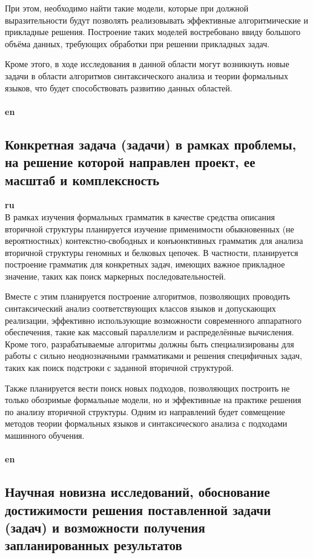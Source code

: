 \documentclass[12pt]{article}  %
\theoremstyle{remark}
\begin{document}
При этом, необходимо найти такие модели, которые при должной выразительности будут позволять реализовывать эффективные алгоритмические и прикладные решения.
Построение таких моделей востребовано ввиду большого объёма данных, требующих обработки при решении прикладных задач.

Кроме этого, в ходе исследования в данной области могут возникнуть новые задачи в области алгоритмов синтаксического анализа и теории формальных языков, что будет способствовать развитию данных областей.
\\
\\
\textbf{en}\\



\subsection{Конкретная задача (задачи) в рамках проблемы, на решение которой направлен проект, ее масштаб и комплексность}

\textbf{ru}\\
В рамках изучения формальных грамматик в качестве средства описания вторичной структуры планируется изучение применимости обыкновенных (не вероятностных) контекстно-свободных и конъюнктивных грамматик для анализа вторичной структуры геномных и белковых цепочек.
В частности, планируется построение грамматик для конкретных задач, имеющих важное прикладное значение, таких как поиск маркерных последовательностей.

Вместе с этим планируется построение алгоритмов, позволяющих проводить синтаксический анализ соответствующих классов языков и допускающих реализации, эффективно использующие возможности современного аппаратного обеспечения, такие как массовый параллелизм и распределённые вычисления.
Кроме того, разрабатываемые алгоритмы должны быть специализированы для работы с сильно неоднозначными грамматиками и решения специфичных задач, таких как поиск подстроки с заданной вторичной структурой.

Также планируется вести поиск новых подходов, позволяющих построить не только обозримые формальные модели, но и эффективные на практике решения по анализу вторичной структуры.
Одним из направлений будет совмещение методов теории формальных языков и синтаксического анализа с подходами машинного обучения.
\\
\\
\textbf{en}\\


\subsection{Научная новизна исследований, обоснование достижимости решения поставленной задачи (задач) и возможности получения запланированных результатов}
\end{document}
